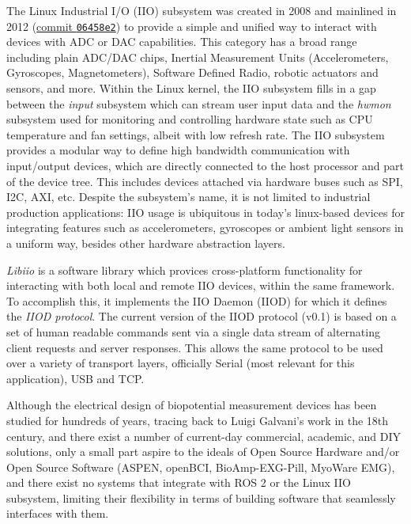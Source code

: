 \documentclass{thesis}
\begin{document}
The Linux Industrial I/O (IIO) subsystem was created in 2008 and mainlined in 2012 (\href{https://github.com/torvalds/linux/commit/06458e277eac2b8761b0a04d3c808d57be281a2e}{commit \texttt{06458e2}}) to provide a simple and unified way to interact with devices with ADC or DAC capabilities. This category has a broad range including plain ADC/DAC chips, Inertial Measurement Units (Accelerometers, Gyroscopes, Magnetometers), Software Defined Radio, robotic actuators and sensors, and more. Within the Linux kernel, the IIO subsystem fills in a gap between the \textit{input} subsystem which can stream user input data and the \textit{hwmon} subsystem used for monitoring and controlling hardware state such as CPU temperature and fan settings, albeit with low refresh rate. The IIO subsystem provides a modular way to define high bandwidth communication with input/output devices, which are directly connected to the host processor and part of the device tree. This includes devices attached via hardware buses such as SPI, I2C, AXI, etc. Despite the subsystem's name, it is not limited to industrial production applications: IIO usage is ubiquitous in today's linux-based devices for integrating features such as accelerometers, gyroscopes or ambient light sensors in a uniform way, besides other hardware abstraction layers.

\textit{Libiio} is a software library which provices cross-platform functionality for interacting with both local and remote IIO devices, within the same framework. To accomplish this, it implements the IIO Daemon (IIOD) for which it defines the \textit{IIOD protocol}. The current version of the IIOD protocol (v0.1) is based on a set of human readable commands sent via a single data stream of alternating client requests and server responses. This allows the same protocol to be used over a variety of transport layers, officially Serial (most relevant for this application), USB and TCP.

Although the electrical design of biopotential measurement devices has been studied for hundreds of years, tracing back to Luigi Galvani's work in the 18th century, and there exist a number of current-day commercial, academic, and DIY solutions, only a small part aspire to the ideals of Open Source Hardware and/or Open Source Software (ASPEN\cite{Esposito2018}, openBCI\cite{openbci}, BioAmp-EXG-Pill\cite{pill}, MyoWare EMG\cite{myoware}), and there exist no systems that integrate with ROS 2 or the Linux IIO subsystem, limiting their flexibility in terms of building software that seamlessly interfaces with them.
\end{document}
